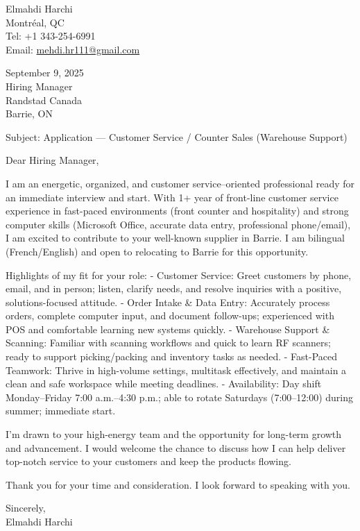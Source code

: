 \documentclass[letterpaper,11pt]{article}
\begin{document}
Elmahdi Harchi\\
Montréal, QC\\
Tel: +1 343-254-6991\\
Email: \href{mailto:mehdi.hr111@gmail.com}{mehdi.hr111@gmail.com}

September 9, 2025\\

Hiring Manager\\
Randstad Canada\\
Barrie, ON

Subject: Application — Customer Service / Counter Sales (Warehouse Support)

Dear Hiring Manager,

I am an energetic, organized, and customer service–oriented professional ready for an immediate interview and start. With 1+ year of front-line customer service experience in fast-paced environments (front counter and hospitality) and strong computer skills (Microsoft Office, accurate data entry, professional phone/email), I am excited to contribute to your well-known supplier in Barrie. I am bilingual (French/English) and open to relocating to Barrie for this opportunity.

Highlights of my fit for your role:
- Customer Service: Greet customers by phone, email, and in person; listen, clarify needs, and resolve inquiries with a positive, solutions-focused attitude.
- Order Intake & Data Entry: Accurately process orders, complete computer input, and document follow-ups; experienced with POS and comfortable learning new systems quickly.
- Warehouse Support & Scanning: Familiar with scanning workflows and quick to learn RF scanners; ready to support picking/packing and inventory tasks as needed.
- Fast-Paced Teamwork: Thrive in high-volume settings, multitask effectively, and maintain a clean and safe workspace while meeting deadlines.
- Availability: Day shift Monday–Friday 7:00 a.m.–4:30 p.m.; able to rotate Saturdays (7:00–12:00) during summer; immediate start.

I’m drawn to your high-energy team and the opportunity for long-term growth and advancement. I would welcome the chance to discuss how I can help deliver top-notch service to your customers and keep the products flowing.

Thank you for your time and consideration. I look forward to speaking with you.

Sincerely,\\[10pt]
Elmahdi Harchi
\end{document}
